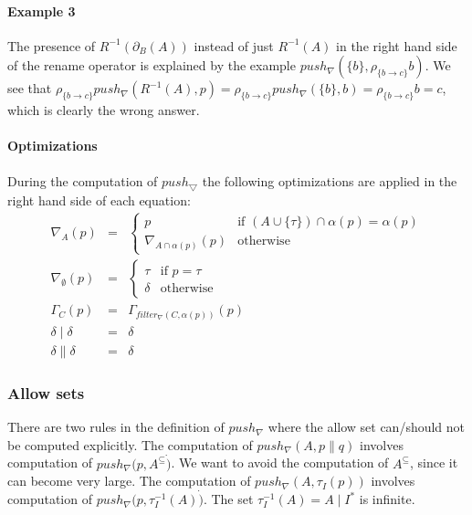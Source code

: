 \documentclass{article}
\begin{document}
\paragraph{Example 3}

The presence of $R^{-1}(\partial _{B}(A))$ instead of just $R^{-1}(A)$ in
the right hand side of the rename operator is explained by the example $%
push_{\nabla }(\{b\},\rho _{\{b\rightarrow c\}}b)$. We see that $\rho
_{\{b\rightarrow c\}}push_{\nabla }(R^{-1}(A),p)=\rho _{\{b\rightarrow
c\}}push_{\nabla }(\{b\},b)=\rho _{\{b\rightarrow c\}}b=c$, which is clearly
the wrong answer.

\paragraph{Optimizations}

During the computation of $push_{\bigtriangledown }$ the following
optimizations are applied in the right hand side of each equation:%
\[
\begin{array}{lll}
\nabla _{A}(p) & = & \left\{ 
\begin{array}{ll}
p & \text{if }(A\cup \{\tau \})\cap \alpha (p)=\alpha (p) \\ 
\nabla _{A\cap \alpha (p)}(p) & \text{otherwise}%
\end{array}%
\right. \\ 
\nabla _{\emptyset }(p) & = & \left\{ 
\begin{array}{ll}
\tau & \text{if }p=\tau \\ 
\delta & \text{otherwise}%
\end{array}%
\right. \\ 
\Gamma _{C}(p) & = & \Gamma _{filter_{\nabla }(C,\alpha (p))}(p) \\ 
\delta \mid \delta & = & \delta \\ 
\delta \parallel \delta & = & \delta%
\end{array}%
\]

\subsubsection{Allow sets}

There are two rules in the definition of $push_{\nabla }$ where the allow
set can/should not be computed explicitly. The computation of $push_{\nabla
}(A,p\parallel q)$ involves computation of $push_{\nabla }(p,A^{\subseteq }%
\dot{)}$. We want to avoid the computation of $A^{\subseteq }$, since it can
become very large. The computation of $push_{\nabla }(A,\tau _{I}(p))$
involves computation of $push_{\nabla }(p,\tau _{I}^{-1}(A)\dot{)}$. The set 
$\tau _{I}^{-1}(A)=A\mid I^{\ast }$ is infinite.
\end{document}
